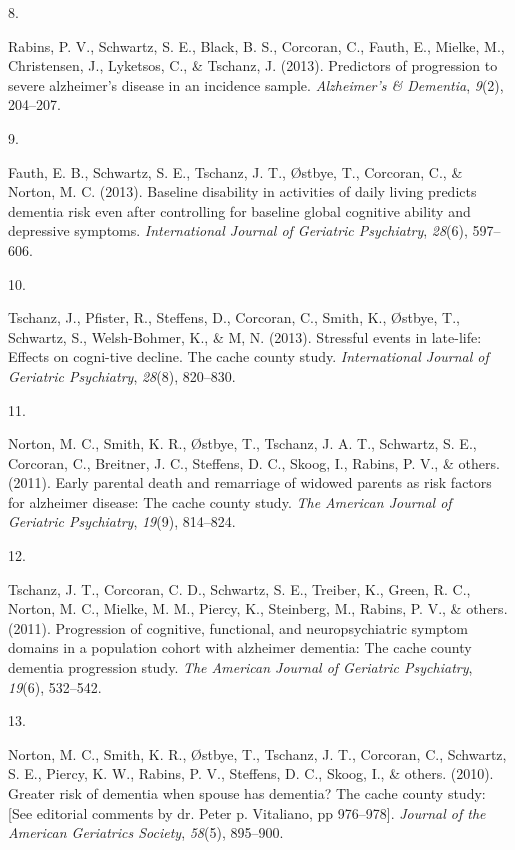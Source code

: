 \documentclass[11pt,a4paper,]{moderncv}
\newlength{\csllabelwidth}
\newcommand{\CSLLeftMargin}[1]{\parbox[t]{\csllabelwidth}{#1}}
\newcommand{\CSLRightInline}[1]{\parbox[t]{\linewidth - \csllabelwidth}{#1}}
\begin{document}
\leavevmode\hypertarget{ref-rabins2013}{}%
\CSLLeftMargin{8. }
\CSLRightInline{Rabins, P. V., Schwartz, S. E., Black, B. S., Corcoran,
C., Fauth, E., Mielke, M., Christensen, J., Lyketsos, C., \& Tschanz, J.
(2013). Predictors of progression to severe alzheimer's disease in an
incidence sample. \emph{Alzheimer's \& Dementia}, \emph{9}(2),
204--207.}

\leavevmode\hypertarget{ref-fauth2013}{}%
\CSLLeftMargin{9. }
\CSLRightInline{Fauth, E. B., Schwartz, S. E., Tschanz, J. T., Østbye,
T., Corcoran, C., \& Norton, M. C. (2013). Baseline disability in
activities of daily living predicts dementia risk even after controlling
for baseline global cognitive ability and depressive symptoms.
\emph{International Journal of Geriatric Psychiatry}, \emph{28}(6),
597--606.}

\leavevmode\hypertarget{ref-tschanz2013}{}%
\CSLLeftMargin{10. }
\CSLRightInline{Tschanz, J., Pfister, R., Steffens, D., Corcoran, C.,
Smith, K., Østbye, T., Schwartz, S., Welsh-Bohmer, K., \& M, N. (2013).
Stressful events in late-life: Effects on cogni-tive decline. The cache
county study. \emph{International Journal of Geriatric Psychiatry},
\emph{28}(8), 820--830.}

\leavevmode\hypertarget{ref-norton2011}{}%
\CSLLeftMargin{11. }
\CSLRightInline{Norton, M. C., Smith, K. R., Østbye, T., Tschanz, J. A.
T., Schwartz, S. E., Corcoran, C., Breitner, J. C., Steffens, D. C.,
Skoog, I., Rabins, P. V., \& others. (2011). Early parental death and
remarriage of widowed parents as risk factors for alzheimer disease: The
cache county study. \emph{The American Journal of Geriatric Psychiatry},
\emph{19}(9), 814--824.}

\leavevmode\hypertarget{ref-tschanz2011}{}%
\CSLLeftMargin{12. }
\CSLRightInline{Tschanz, J. T., Corcoran, C. D., Schwartz, S. E.,
Treiber, K., Green, R. C., Norton, M. C., Mielke, M. M., Piercy, K.,
Steinberg, M., Rabins, P. V., \& others. (2011). Progression of
cognitive, functional, and neuropsychiatric symptom domains in a
population cohort with alzheimer dementia: The cache county dementia
progression study. \emph{The American Journal of Geriatric Psychiatry},
\emph{19}(6), 532--542.}

\leavevmode\hypertarget{ref-norton2010}{}%
\CSLLeftMargin{13. }
\CSLRightInline{Norton, M. C., Smith, K. R., Østbye, T., Tschanz, J. T.,
Corcoran, C., Schwartz, S. E., Piercy, K. W., Rabins, P. V., Steffens,
D. C., Skoog, I., \& others. (2010). Greater risk of dementia when
spouse has dementia? The cache county study: {[}See editorial comments
by dr. Peter p. Vitaliano, pp 976--978{]}. \emph{Journal of the American
Geriatrics Society}, \emph{58}(5), 895--900.}
\end{document}
